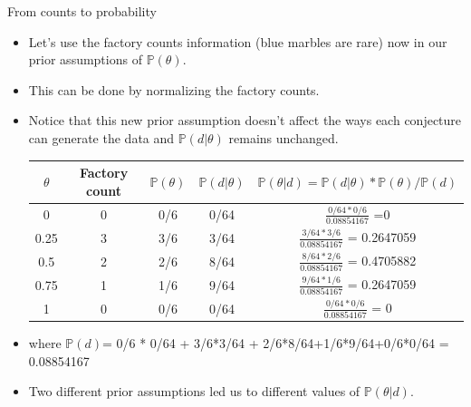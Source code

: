 \documentclass[handout]{beamer}
\begin{document}
\begin{frame}{From counts to probability}
\scriptsize{
\begin{itemize}
\item Let's use the factory counts information (blue marbles are rare) now in our prior assumptions of $\mathbb{P}(\theta)$.  \\ 
\item This can be done by normalizing the factory counts.  

\item Notice that this new prior assumption doesn't affect the ways each conjecture can generate the data and $\mathbb{P}(d|\theta)$ remains unchanged.
 
 \vspace{0.3cm}
  \begin{tabular}{c|c|c|c|c} \hline
$\theta$ & Factory count & $\mathbb{P}(\theta)$ &  $\mathbb{P}(d|\theta)$ & $\mathbb{P}(\theta|d) = \mathbb{P}(d|\theta)*\mathbb{P}(\theta) / \mathbb{P}(d)$  \\ \hline
0 & 0 & 0/6 &  0/64 &  $\frac{0/64*0/6}{0.08854167}$ =0 \\
0.25 & 3 & 3/6 & 3/64 & $\frac{3/64*3/6}{0.08854167}$ = 0.2647059
\\
0.5 & 2 & 2/6  & 8/64 & $\frac{8/64*2/6}{0.08854167}$ = 0.4705882 \\
0.75 & 1 &  1/6 & 9/64 & $\frac{9/64*1/6}{0.08854167}$ = 0.2647059  \\
1 &  0 & 0/6 &  0/64 & $\frac{0/64*0/6}{0.08854167}$ = 0 \\ 
\end{tabular} 
\vspace{0.3cm} 
 
\item where $\mathbb{P}(d)$= 0/6 * 0/64 + 3/6*3/64 + 2/6*8/64+1/6*9/64+0/6*0/64 =  0.08854167

\item Two different prior assumptions led us to different values of $\mathbb{P}(\theta|d)$.
 
\end{itemize}
 } 

\end{frame}
\end{document}
